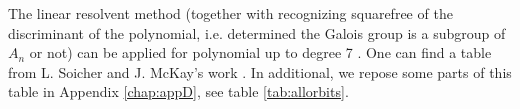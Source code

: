 
The linear resolvent method (together with recognizing squarefree of the discriminant of the polynomial, i.e. determined the Galois group is a subgroup of $A_n$ or not) can be applied for polynomial up to degree 7 \citep{soicher1985computing}. One can find a table from  L. Soicher and J. McKay's work \citep{soicher1985computing}. In additional, we repose some parts of this table in Appendix \ref{chap:appD}, see table \ref{tab:allorbits}.





    
 




